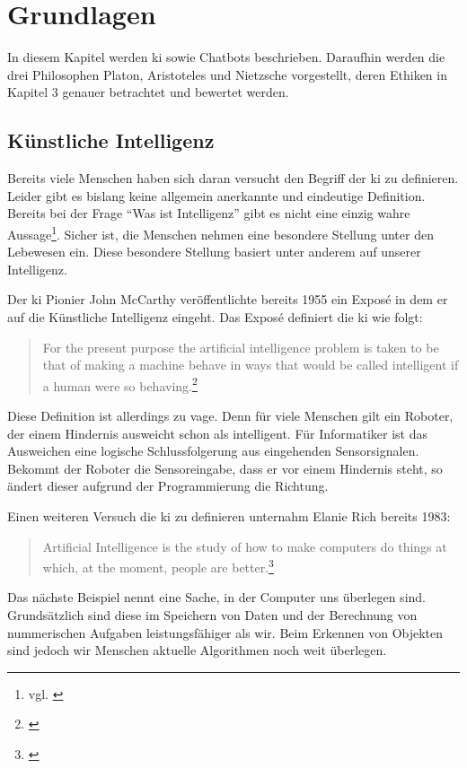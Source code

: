 \section{Grundlagen}
In diesem Kapitel werden \ac{ki} sowie Chatbots beschrieben.
Daraufhin werden die drei Philosophen Platon, Aristoteles und Nietzsche vorgestellt, deren Ethiken in Kapitel 3 genauer betrachtet und bewertet werden.

\subsection{Künstliche Intelligenz}
Bereits viele Menschen haben sich daran versucht den Begriff der \ac{ki} zu definieren. Leider gibt es bislang keine allgemein anerkannte und eindeutige Definition. Bereits bei der Frage \enquote{Was ist Intelligenz} gibt es nicht eine einzig wahre Aussage\footnote{vgl. \cite{Intelligenz}}. Sicher ist, die Menschen nehmen eine besondere Stellung unter den Lebewesen ein. Diese besondere Stellung basiert unter anderem auf unserer Intelligenz. 

Der \ac{ki} Pionier John McCarthy veröffentlichte bereits 1955 ein Exposé in dem er auf die Künstliche Intelligenz eingeht. Das Exposé definiert die \ac{ki} wie folgt:
\begin{quote}
		\glqq For the present purpose the artificial intelligence problem is taken to be that of making a machine behave in ways that would be called intelligent if a human were so behaving\grqq.\footnote{\cite{PROPOSALMcCarthy}}
\end{quote}
Diese Definition ist allerdings zu vage. Denn für viele Menschen gilt ein Roboter, der einem Hindernis ausweicht schon als intelligent. Für Informatiker ist das Ausweichen eine logische Schlussfolgerung aus eingehenden Sensorsignalen. Bekommt der Roboter die Sensoreingabe, dass er vor einem Hindernis steht, so ändert dieser aufgrund der Programmierung die Richtung.

Einen weiteren Versuch die \ac{ki} zu definieren unternahm Elanie Rich bereits 1983:
\begin{quote}
	 \glqq Artificial Intelligence is the study of how to make computers do things at which, at the moment, people are better\grqq.\footnote{\cite{ArtificialIntelligence}}
\end{quote}

Das nächste Beispiel nennt eine \glqq Sache\grqq , in der Computer uns überlegen sind. 
Grundsätzlich sind diese im Speichern von Daten und der Berechnung von nummerischen Aufgaben leistungsfähiger als wir. 
Beim Erkennen von Objekten sind jedoch wir Menschen aktuelle Algorithmen noch weit überlegen. 

